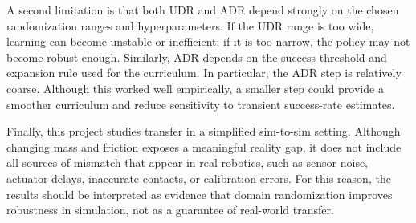 A second limitation is that both UDR and ADR depend strongly on the chosen randomization ranges and hyperparameters. If the UDR range is too wide, learning can become unstable or inefficient; if it is too narrow, the policy may not become robust enough. Similarly, ADR
depends on the success threshold and expansion rule used for the curriculum.
In particular, the ADR step is relatively coarse. Although this worked well empirically, a smaller step could
provide a smoother curriculum and reduce sensitivity to transient success-rate
estimates.


Finally, this project studies transfer in a simplified sim-to-sim setting. Although changing mass and friction exposes a meaningful reality gap, it does not include all sources of mismatch that appear in real robotics, such as sensor noise, actuator delays, inaccurate
contacts, or calibration errors. For this reason, the results should be interpreted as evidence that domain randomization improves robustness in simulation, not as a guarantee of real-world transfer.

